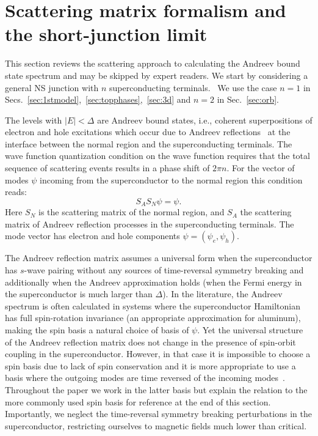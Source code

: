 \documentclass[twocolumn, notitlepage, 10pt, aps, floatfix, showpacs, prb, citeautoscript]{revtex4-1}
\newcommand{\comment}[1]{}
\begin{document}
\section{Scattering matrix formalism and the short-junction limit}
\label{sec:formalism}
This section reviews the scattering approach to calculating the Andreev bound state spectrum and may be skipped by expert readers.
We start by considering a general NS junction with $n$ superconducting terminals.~\cite{Heck2014}
We use the case $n=1$ in Secs.~\ref{sec:1stmodel},~\ref{sec:topphases},~\ref{sec:3d} and $n=2$ in Sec.~\ref{sec:orb}.

\comment{Andreev bound states condition.}
The levels with $|E|<\Delta$ are Andreev bound states, i.e., coherent superpositions of electron and hole excitations which occur due to Andreev reflections~\cite{Andreev1964} at the interface between the normal region and the superconducting terminals.
The wave function quantization condition on the wave function requires that the total sequence of scattering events results in a phase shift of $2\pi n$.
For the vector of modes $\psi$ incoming from the superconductor to the normal region this condition reads:
\begin{equation}\label{bound}
S_A S_N\psi=\psi.
\end{equation}
Here $S_N$ is the scattering matrix of the normal region, and $S_A$ the scattering matrix of Andreev reflection processes in the superconducting terminals.
The mode vector has electron and hole components $\psi=(\psi_e, \psi_h)$.

\comment{Different bases}
The Andreev reflection matrix assumes a universal form when the superconductor has $s$-wave pairing without any sources of time-reversal symmetry breaking and additionally when the Andreev approximation holds (when the Fermi energy in the superconductor is much larger than $\Delta$).
In the literature, the Andreev spectrum is often calculated in systems where the superconductor Hamiltonian has full spin-rotation invariance (an appropriate approximation for aluminum), making the spin basis a natural choice of basis of $\psi$.
Yet the universal structure of the Andreev reflection matrix does not change in the presence of spin-orbit coupling in the superconductor.
However, in that case it is impossible to choose a spin basis due to lack of spin conservation and it is more appropriate to use a basis where the outgoing modes are time reversed of the incoming modes~\cite{Bardarson2008}.
Throughout the paper we work in the latter basis but explain the relation to the more commonly used spin basis for reference at the end of this section.
Importantly, we neglect the time-reversal symmetry breaking perturbations in the superconductor, restricting ourselves to magnetic fields much lower than critical.
\end{document}
